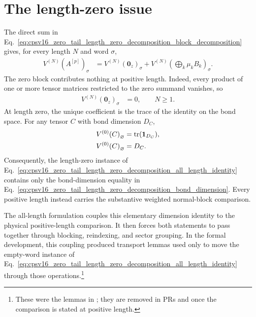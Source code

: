 \documentclass{article}
\newcommand{\MPV}[2]{V^{(#1)}\!\left(#2\right)}
\begin{document}
\section{The length-zero issue}

The direct sum in
Eq.~\ref{eq:cpsv16_zero_tail_length_zero_decomposition_block_decomposition}
gives, for every length $N$ and word $\sigma$,
\begin{align}
    \MPV{N}{A^{[p]}}_\sigma
        &= \MPV{N}{\mathbf 0_z}_\sigma
           +\MPV{N}{\textstyle\bigoplus_k\mu_k B_k}_\sigma.
    \label{eq:cpsv16_zero_tail_length_zero_decomposition_all_length_identity}
\end{align}
The zero block contributes nothing at positive length. Indeed, every product
of one or more tensor matrices restricted to the zero summand vanishes, so
\begin{align}
    \MPV{N}{\mathbf 0_z}_\sigma
        &= 0,
        \qquad N\geq1.
    \label{eq:cpsv16_zero_tail_length_zero_decomposition_zero_block_positive_length}
\end{align}
At length zero, the unique coefficient is the trace of the identity on the
bond space. For any tensor $C$ with bond dimension $D_C$,
\begin{align}
    \MPV{0}{C}_{\varnothing}
        &= \tr(\mathbf 1_{D_C}),
    \label{eq:cpsv16_zero_tail_length_zero_decomposition_empty_word_trace}\\
    \MPV{0}{C}_{\varnothing}
        &= D_C.
    \label{eq:cpsv16_zero_tail_length_zero_decomposition_empty_word_dimension}
\end{align}
Consequently, the length-zero instance of
Eq.~\ref{eq:cpsv16_zero_tail_length_zero_decomposition_all_length_identity}
contains only the bond-dimension equality in
Eq.~\ref{eq:cpsv16_zero_tail_length_zero_decomposition_bond_dimension}.
Every positive length instead carries the substantive weighted normal-block
comparison.

The all-length formulation couples this elementary dimension identity to the
physical positive-length comparison. It then forces both statements to pass
together through blocking, reindexing, and sector grouping. In the formal
development, this coupling produced transport lemmas used only to move the
empty-word instance of
Eq.~\ref{eq:cpsv16_zero_tail_length_zero_decomposition_all_length_identity}
through those operations.\footnote{%
  These were the  lemmas in
  ; they are removed in
  PRs  and  once the comparison is stated at positive
  length.}
\end{document}
